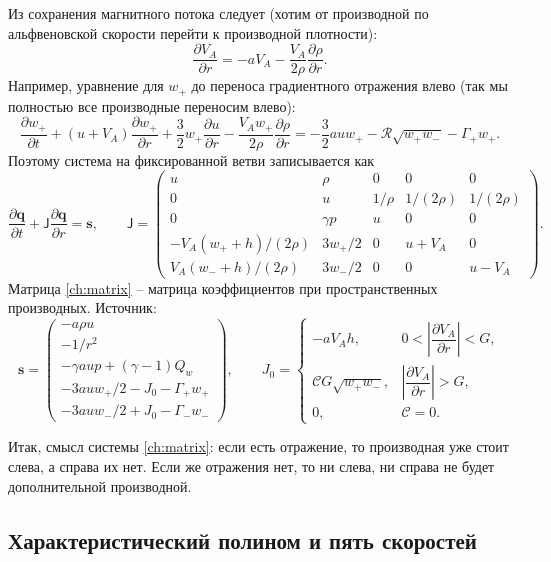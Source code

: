 \documentclass[11pt,a4paper]{article}
\newcommand{\VA}{V_A}
\newcommand{\Rref}{\mathcal R}
\begin{document}
Из сохранения магнитного потока следует (хотим от производной по альфвеновской скорости перейти к производной плотности):
\[
 \frac{\partial\VA}{\partial r}
 =-a\VA-\frac{\VA}{2\rho}\frac{\partial\rho}{\partial r}.
\]
Например, уравнение для $w_+$ до переноса градиентного отражения влево (так мы полностью все производные переносим влево):
\[
 \frac{\partial w_+}{\partial t}
 +(u+\VA)\frac{\partial w_+}{\partial r}
 +\frac32w_+\frac{\partial u}{\partial r}
 -\frac{\VA w_+}{2\rho}\frac{\partial\rho}{\partial r}
 =-\frac32au w_+-\Rref\sqrt{w_+w_-}-\Gamma_+w_+.
\]
Поэтому система на фиксированной ветви записывается как
\begin{equation}
 \frac{\partial\bm q}{\partial t}
 +\mathsf J\frac{\partial\bm q}{\partial r}=\bm s,
 \qquad
 \mathsf J=\begin{pmatrix}
 u&\rho&0&0&0\\
 0&u&1/\rho&1/(2\rho)&1/(2\rho)\\
 0&\gamma p&u&0&0\\
 -\VA(w_++h)/(2\rho)&3w_+/2&0&u+\VA&0\\
 \VA(w_-+h)/(2\rho)&3w_-/2&0&0&u-\VA
 \end{pmatrix}.
 \label{ch:matrix}
\end{equation}
Матрица \eqref{ch:matrix} -- матрица коэффициентов при пространственных производных. Источник:
\[
 \bm s=\begin{pmatrix}
 -a\rho u\\ -1/r^2\\
 -\gamma aup+(\gamma-1)Q_w\\
 -3au w_+/2-J_0-\Gamma_+w_+\\
 -3au w_-/2+J_0-\Gamma_-w_-
 \end{pmatrix},\qquad
J_0=
\begin{cases}
-aV_Ah,
& 0<\left|\dfrac{\partial V_A}{\partial r}\right|<G,\\[8pt]
\mathcal C G\sqrt{w_+w_-},
& \left|\dfrac{\partial V_A}{\partial r}\right|>G,\\[8pt]
0,
& \mathcal C=0.
\end{cases}
\]

Итак, смысл системы \eqref{ch:matrix}: если есть отражение, то производная уже стоит слева, а справа их нет. Если же отражения нет, то ни слева, ни справа не будет дополнительной производной.

\subsection{Характеристический полином и пять скоростей}
\end{document}
